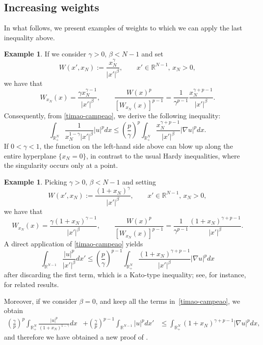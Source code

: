 \documentclass[12pt]{amsart}
\theoremstyle{definition}
\newtheorem{example}[theorem]{Example}
\theoremstyle{plain}
\begin{document}
\subsection{Increasing weights}

In what follows, we present examples of weights to which we can apply the last inequality above.


\begin{example} 
     If we consider  $\gamma>0$, $\beta<N-1$ and set
$$
W(x',x_N) := \frac{x_N^\gamma}{|x'|^\beta}, \qquad x'\in\mathbb{R}^{N-1},\,x_N>0,
$$
we have that
$$
W_{x_N}(x) = \frac{\gamma x_N^{\gamma-1}}{|x'|^\beta},\qquad \frac{W(x)^p}{[W_{x_N}(x)]^{p-1}} 
= \frac{1}{\gamma^{p-1}} \frac{x_N^{\gamma+p-1}}{|x'|^\beta}.
$$
Consequently, from \eqref{timao-campeao}, we derive the following inequality:
$$
\int_{\mathbb{R}^N_+}  \frac{1}{x_N^{1-\gamma}|x'|^\beta} |u|^p dx \leq 
\left( \frac{p}{\gamma}\right)^{p} \int_{\mathbb{R}^{N}_+} \frac{x_N^{\gamma+p-1}}{|x'|^\beta} 
|\nabla u|^pdx.
$$
If $0<\gamma<1$, the function on the left-hand side above can blow up along the 
entire hyperplane $\{x_N = 0\}$, in contrast to the usual Hardy inequalities, 
where the singularity occurs only at a point.
\end{example}

\begin{example}\label{ex21} 
    Picking $\gamma>0$, $\beta < N-1$ and setting
$$
W(x',x_N) := \frac{(1+x_N)^\gamma}{|x'|^\beta}, \qquad x'\in\mathbb{R}^{N-1},\,x_N>0,
$$
we have that
$$
W_{x_N}(x) = \frac{\gamma(1+x_N)^{\gamma-1}}{|x'|^\beta},\qquad \frac{W(x)^p}{[W_{x_N}(x)]^{p-1}} = \frac{1}{\gamma^{p-1}} \frac{(1+x_N)^{\gamma+p-1}}{|x'|^\beta}.
$$
A  direct application of   \eqref{timao-campeao} yields
$$
\int_{\mathbb{R}^{N-1}}  \frac{|u|^p}{|x'|^\beta} dx'\leq \left( \frac{p}{\gamma}\right)^{p-1} \int_{\mathbb{R}^{N}_+} \frac{(1+x_N)^{\gamma+p-1}}{|x'|^\beta} |\nabla u|^pdx
$$
after discarding the first term,
which is a Kato-type inequality; see, for instance, \cite{Davila-Dupaigne-Montenegro} for related results.

Moreover, if we consider $\beta=0$, and keep all the terms in~\eqref{timao-campeao}, 
we obtain
		$$
			\begin{aligned}
				\left(\frac{\gamma}{p}\right)^{p}\int_{\mathbb{R}^N_+} \frac{|u|^p}{(1+x_N)^{1-\gamma}}dx&+\left(\frac{\gamma}{p}\right)^{p-1}	\int_{\mathbb{R}^{N-1}} |u|^{p}dx'
				&\leq \int_{\mathbb{R}^{N}_+}(1+x_N)^{\gamma+p-1}|\nabla u|^pdx,
			\end{aligned}
		$$
    and therefore we have obtained a new proof of \cite[Theorem 1.1]{Abreu-Furtado-Medeiros}. 
\end{example}
\end{document}
